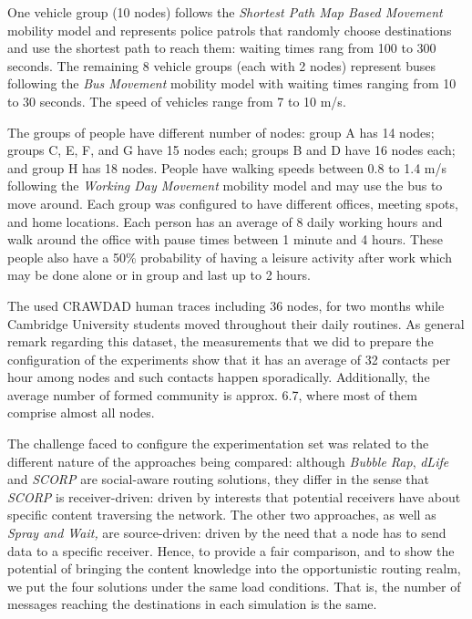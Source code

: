 \documentclass[lnicst]{svmultln}
\begin{document}
One vehicle group (10 nodes) follows the \emph{Shortest Path Map Based
Movement} mobility model and represents police patrols that randomly
choose destinations and use the shortest path to reach them: waiting
times rang from 100 to 300 seconds. The remaining 8 vehicle groups
(each with 2 nodes) represent buses following the \emph{Bus Movement}
mobility model with waiting times ranging from 10 to 30 seconds. The
speed of vehicles range from 7 to 10 m/s. 

The groups of people have different number of nodes: group A has 14
nodes; groups C, E, F, and G have 15 nodes each; groups B and D have
16 nodes each; and group H has 18 nodes. People have walking speeds
between 0.8 to 1.4 m/s following the \emph{Working Day Movement} mobility
model and may use the bus to move around. Each group was configured
to have different offices, meeting spots, and home locations. Each
person has an average of 8 daily working hours and walk around the
office with pause times between 1 minute and 4 hours. These people
also have a 50\% probability of having a leisure activity after work
which may be done alone or in group and last up to 2 hours.

The used CRAWDAD human traces \cite{cambridge-haggle-imote-content-2006-09-15}
including 36 nodes, for two months while Cambridge University students
moved throughout their daily routines. As general remark regarding
this dataset, the measurements that we did to prepare the configuration
of the experiments show that it has an average of 32 contacts per
hour among nodes and such contacts happen sporadically. Additionally,
the average number of formed community is approx. 6.7, where most
of them comprise almost all nodes.

The challenge faced to configure the experimentation set was related
to the different nature of the approaches being compared: although
\emph{Bubble Rap}, \emph{dLife} and \emph{SCORP} are social-aware
routing solutions, they differ in the sense that \emph{SCORP} is receiver-driven:
driven by interests that potential receivers have about specific content
traversing the network. The other two approaches, as well as \emph{Spray
and Wait,} are source-driven: driven by the need that a node has to
send data to a specific receiver. Hence, to provide a fair comparison,
and to show the potential of bringing the content knowledge into the
opportunistic routing realm, we put the four solutions under the same
load conditions. That is, the number of messages reaching the destinations
in each simulation is the same.
\end{document}
